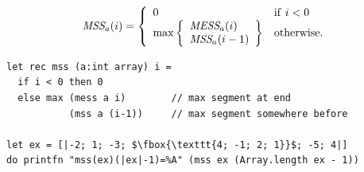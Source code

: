 \documentclass[rgb]{beamer}
\begin{document}
\begin{frame}[fragile]
\begin{footnotesize}

  \vspace{1ex}

  \[
  \mbox{\it{MSS}}_a(i) = \left \{ \begin{array}{ll} 0 & \mathrm{if}~i < 0 \\
    \mathrm{max} \left \{ \begin{array}{l} \mbox{\it{MESS}}_a(i) \\
                                           \mbox{\it{MSS}}_a(i-1)
                          \end{array} \right \} & \mathrm{otherwise}. \end{array} \right .
  \]

  \vspace{1ex}

\begin{lstlisting}[numbers=none,frame=none,mathescape]
let rec mss (a:int array) i =
  if i < 0 then 0
  else max (mess a i)        // max segment at end
           (mss a (i-1))     // max segment somewhere before

let ex = [|-2; 1; -3; $\fbox{\texttt{4; -1; 2; 1}}$; -5; 4|]
do printfn "mss(ex)(|ex|-1)=%A" (mss ex (Array.length ex - 1))
\end{lstlisting}

\end{footnotesize}
\end{frame}
\end{document}
